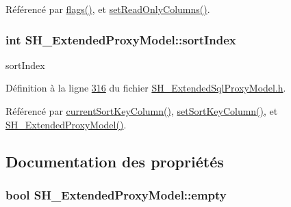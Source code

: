 Référencé par \hyperlink{classSH__ExtendedProxyModel_aa12f3d989293da24fb47fd96a080cdc0}{flags()}, et \hyperlink{classSH__ExtendedProxyModel_a985d27d4f35a303e0cd453a05910da1d}{set\-Read\-Only\-Columns()}.

\hypertarget{classSH__ExtendedProxyModel_a83cabe4cf90a26d26c4aaa40e944b2bd}{
\subsubsection[{sort\-Index}]{\setlength{\rightskip}{0pt plus 5cm}int S\-H\-\_\-\-Extended\-Proxy\-Model\-::sort\-Index\hspace{0.3cm}{\ttfamily [private]}}}\label{classSH__ExtendedProxyModel_a83cabe4cf90a26d26c4aaa40e944b2bd}


sort\-Index 



Définition à la ligne \hyperlink{SH__ExtendedSqlProxyModel_8h_source_l00316}{316} du fichier \hyperlink{SH__ExtendedSqlProxyModel_8h_source}{S\-H\-\_\-\-Extended\-Sql\-Proxy\-Model.\-h}.



Référencé par \hyperlink{classSH__ExtendedProxyModel_adbbc1e62c72991f4ed14537cf1ba9c8f}{current\-Sort\-Key\-Column()}, \hyperlink{classSH__ExtendedProxyModel_ab8123244a5060aa35f5bce651046b99d}{set\-Sort\-Key\-Column()}, et \hyperlink{classSH__ExtendedProxyModel_a63b0969a9f5799c9e871e6ceb13cf83e}{S\-H\-\_\-\-Extended\-Proxy\-Model()}.



\subsection{Documentation des propriétés}
\hypertarget{classSH__ExtendedProxyModel_a9e22d17af7776aca8052084cc33c3442}{
\subsubsection[{empty}]{\setlength{\rightskip}{0pt plus 5cm}bool S\-H\-\_\-\-Extended\-Proxy\-Model\-::empty\hspace{0.3cm}{\ttfamily [read]}}}\label{classSH__ExtendedProxyModel_a9e22d17af7776aca8052084cc33c3442}


